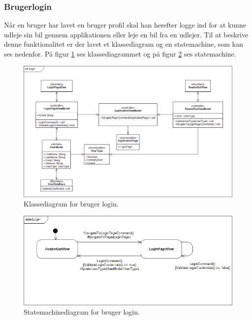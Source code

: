 \documentclass[Arkitektur/System_main.tex]{subfiles}
\begin{document}
\subsubsection{Brugerlogin}
Når en bruger har lavet en bruger profil skal han herefter logge ind for at kunne udleje sin bil gennem applikationen eller leje en bil fra en udlejer. Til at beskrive denne funktionalitet er der lavet et klassediagram og en statemachine, som kan ses nedenfor. På figur \ref{fig:LoginCD} ses klassediagrammet og på figur \ref{fig:LoginSTM} ses statemachine.

\begin{figure}[H]
    \centering
    \includegraphics[width=\textwidth]{Arkitektur/Softwarearkitektur/User_Login/graphics/LoginCD.png}
    \caption{Klassediagram for bruger login. }
    \label{fig:LoginCD}
\end{figure}

\begin{figure}[H]
    \centering
    \includegraphics[width=\textwidth]{Arkitektur/Softwarearkitektur/User_Login/graphics/LoginSTM.png}
    \caption{Statemachinediagram for bruger login. }
    \label{fig:LoginSTM}
\end{figure}
\end{document}
